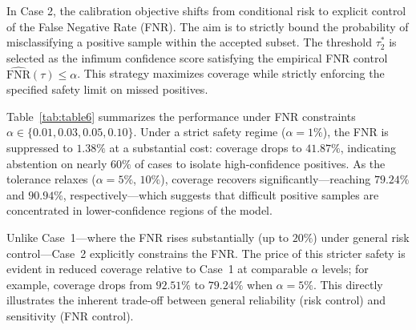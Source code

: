 \documentclass[journal]{IEEEtran}
\theoremstyle{remark}
\begin{document}
In Case 2, the calibration objective shifts from conditional risk to explicit control of the False Negative Rate (FNR). The aim is to strictly bound the probability of misclassifying a positive sample within the accepted subset. The threshold $\tau_2^*$ is selected as the infimum confidence score satisfying the empirical FNR control $\widehat{\mathrm{FNR}}(\tau) \le \alpha$. This strategy maximizes coverage while strictly enforcing the specified safety limit on missed positives.

\begin{table}[htbp]
    \centering
    \caption{The selective classification performance of Case 2.}
    \label{tab:table6}
    \vskip -0.1in
\end{table}

Table~\ref{tab:table6} summarizes the performance under FNR constraints $\alpha \in \{0.01, 0.03, 0.05, 0.10\}$. Under a strict safety regime ($\alpha=1\%$), the FNR is suppressed to $1.38\%$ at a substantial cost: coverage drops to $41.87\%$, indicating abstention on nearly $60\%$ of cases to isolate high-confidence positives. As the tolerance relaxes ($\alpha=5\%$, $10\%$), coverage recovers significantly—reaching $79.24\%$ and $90.94\%$, respectively—which suggests that difficult positive samples are concentrated in lower-confidence regions of the model.

Unlike Case~1—where the FNR rises substantially (up to $20\%$) under general risk control—Case~2 explicitly constrains the FNR. The price of this stricter safety is evident in reduced coverage relative to Case~1 at comparable $\alpha$ levels; for example, coverage drops from $92.51\%$ to $79.24\%$ when $\alpha=5\%$. This directly illustrates the inherent trade-off between general reliability (risk control) and sensitivity (FNR control).
\end{document}
